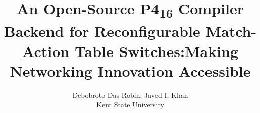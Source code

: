 \usepackage{filecontents}
\usepackage{cite}
\usepackage{amsmath,amssymb,amsfonts}
\usepackage{graphicx}
\usepackage{textcomp}
\usepackage{tabularx}
\usepackage{subcaption}
\usepackage{makecell}
\usepackage{url}
\usepackage[switch]{lineno}
\usepackage{listings}
\usepackage{multirow}

\captionsetup{compatibility=false}
\usepackage[margin=0.5in]{geometry}
\usepackage{textcomp}

\usepackage{listings}






\title{ An Open-Source P4\textsubscript{16} Compiler Backend for Reconfigurable Match-Action Table Switches:Making Networking Innovation Accessible}

\author{Debobroto Das Robin,  Javed I. Khan \\
Kent State University}

